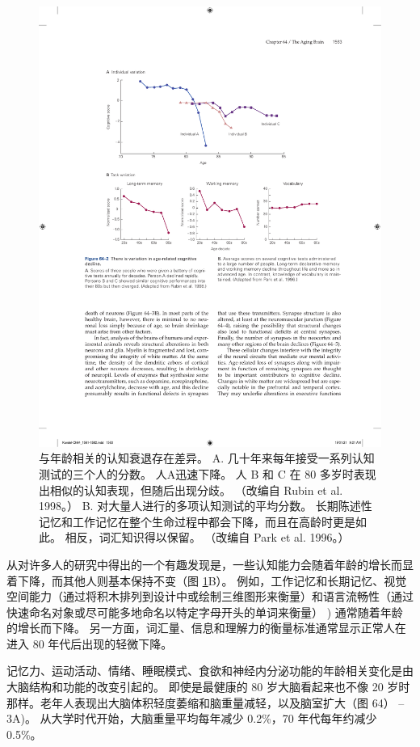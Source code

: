 \begin{figure}[htbp]
	\centering
	\includegraphics[width=0.8\linewidth]{chap64/fig_64_2}
	\caption{与年龄相关的认知衰退存在差异。 A. 几十年来每年接受一系列认知测试的三个人的分数。 人A迅速下降。 人 B 和 C 在 80 多岁时表现出相似的认知表现，但随后出现分歧。 （改编自 Rubin et al. 1998。） B. 对大量人进行的多项认知测试的平均分数。 长期陈述性记忆和工作记忆在整个生命过程中都会下降，而且在高龄时更是如此。 相反，词汇知识得以保留。 （改编自 Park et al. 1996。）}
	\label{fig:64_2}
\end{figure}


从对许多人的研究中得出的一个有趣发现是，一些认知能力会随着年龄的增长而显着下降，而其他人则基本保持不变（图 \ref{fig:64_2}B）。
例如，工作记忆和长期记忆、视觉空间能力（通过将积木排列到设计中或绘制三维图形来衡量）和语言流畅性（通过快速命名对象或尽可能多地命名以特定字母开头的单词来衡量） ) 通常随着年龄的增长而下降。
另一方面，词汇量、信息和理解力的衡量标准通常显示正常人在进入 80 年代后出现的轻微下降。


记忆力、运动活动、情绪、睡眠模式、食欲和神经内分泌功能的年龄相关变化是由大脑结构和功能的改变引起的。
即使是最健康的 80 岁大脑看起来也不像 20 岁时那样。老年人表现出大脑体积轻度萎缩和脑重量减轻，以及脑室扩大（图 64） –3A)。
从大学时代开始，大脑重量平均每年减少 0.2\%，70 年代每年约减少 0.5\%。


